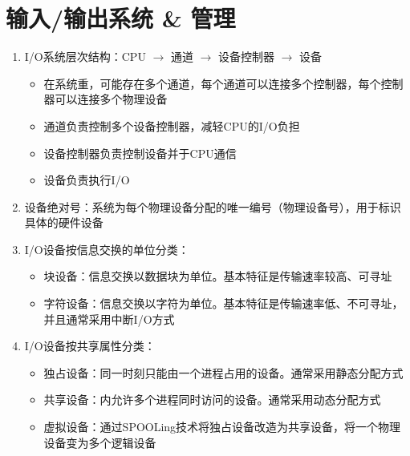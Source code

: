 \documentclass[./computer-organization-and-architecture.tex]{subfiles}
\begin{document}
    \section{输入/输出系统 \& 管理}

    \begin{enumerate}
        \item I/O系统层次结构：CPU $\rightarrow$ 通道 $\rightarrow$ 设备控制器 $\rightarrow$ 设备
        \begin{itemize}
            \item 在系统重，可能存在多个通道，每个通道可以连接多个控制器，每个控制器可以连接多个物理设备
            \item 通道负责控制多个设备控制器，减轻CPU的I/O负担
            \item 设备控制器负责控制设备并于CPU通信
            \item 设备负责执行I/O
        \end{itemize}
        \item 设备绝对号：系统为每个物理设备分配的唯一编号（物理设备号），用于标识具体的硬件设备
        \item I/O设备按信息交换的单位分类：
        \begin{itemize}
            \item 块设备：信息交换以数据块为单位。基本特征是传输速率较高、可寻址
            \item 字符设备：信息交换以字符为单位。基本特征是传输速率低、不可寻址，并且通常采用中断I/O方式
        \end{itemize}
        \item I/O设备按共享属性分类：
        \begin{itemize}
            \item 独占设备：同一时刻只能由一个进程占用的设备。通常采用静态分配方式
            \item 共享设备：{\color{red}{同一时间段}}内允许多个进程同时访问的设备。通常采用动态分配方式
            \item 虚拟设备：通过SPOOLing技术将独占设备改造为共享设备，将一个物理设备变为多个逻辑设备
        \end{itemize}
    \end{enumerate}
\end{document}
